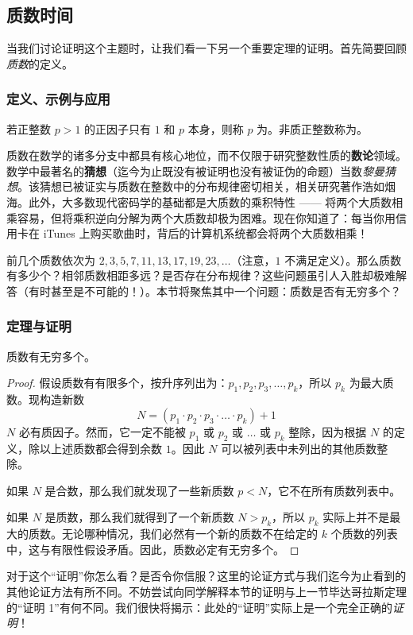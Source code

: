 \subsection{质数时间}\label{sec:section1.1.2}

当我们讨论证明这个主题时，让我们看一下另一个重要定理的证明。首先简要回顾\emph{质数}的定义。

\subsubsection*{定义、示例与应用}

\begin{definition}\label{def:prime}
    若正整数 $p>1$ 的正因子只有 $1$ 和 $p$ 本身，则称 $p$ 为。非质正整数称为。
\end{definition}

质数在数学的诸多分支中都具有核心地位，而不仅限于研究整数性质的\textbf{数论}领域。数学中最著名的\textbf{猜想}（迄今为止既没有被证明也没有被证伪的命题）当数\emph{黎曼猜想}。该猜想已被证实与质数在整数中的分布规律密切相关，相关研究著作浩如烟海。此外，大多数现代密码学的基础都是大质数的乘积特性 —— 将两个大质数相乘容易，但将乘积逆向分解为两个大质数却极为困难。现在你知道了：每当你用信用卡在 iTunes 上购买歌曲时，背后的计算机系统都会将两个大质数相乘！

前几个质数依次为 $2, 3, 5, 7, 11, 13, 17, 19, 23,\dots$（注意，$1$ 不满足定义）。那么质数有多少个？相邻质数相距多远？是否存在分布规律？这些问题虽引人入胜却极难解答（有时甚至是不可能的！）。本节将聚焦其中一个问题：质数是否有无穷多个？

\subsubsection*{定理与证明}

\begin{theorem}[质数无穷性]
    质数有无穷多个。
\end{theorem}

\begin{proof}
    假设质数有有限多个，按升序列出为：$p_1, p_2, p_3, \dots, p_k$，所以 $p_k$ 为最大质数。现构造新数
    \[N = (p_1 \cdot p_2 \cdot p_3 \cdot \dots \cdot p_k) + 1\]
    $N$ 必有质因子。然而，它一定不能被 $p_1$ 或 $p_2$ 或 $\dots$ 或 $p_k$ 整除，因为根据 $N$ 的定义，除以上述质数都会得到余数 $1$。因此 $N$ 可以被列表中未列出的其他质数整除。

    如果 $N$ 是合数，那么我们就发现了一些新质数 $p < N$，它不在所有质数列表中。
    
    如果 $N$ 是质数，那么我们就得到了一个新质数 $N > p_k$，所以 $p_k$ 实际上并不是最大的质数。无论哪种情况，我们必然有一个新的质数不在给定的 $k$ 个质数的列表中，这与有限性假设矛盾。因此，质数必定有无穷多个。
\end{proof}

对于这个``证明''你怎么看？是否令你信服？这里的论证方式与我们迄今为止看到的其他论证方法有所不同。不妨尝试向同学解释本节的证明与上一节毕达哥拉斯定理的``证明 1''有何不同。我们很快将揭示：此处的``证明''实际上是一个完全正确的\emph{证明}！
